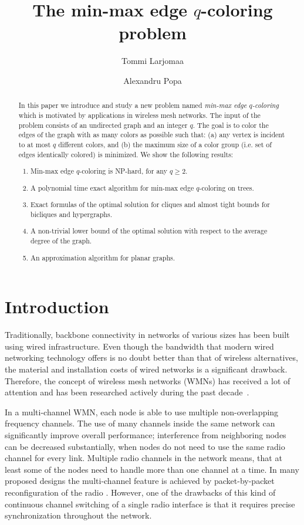 \documentclass[runningheads, a4paper]{llncs}
\title{The min-max edge $q$-coloring problem}
\author{Tommi Larjomaa \and Alexandru Popa}
\institute{
Department of Communications \& Networking, Aalto University School of Electrical Engineering, Aalto, Finland. \\ E-mails: \email{\{tommi.larjomaa@aalto.fi, alexandru.popa@aalto.fi\}}
}
\begin{document}
\maketitle
\begin{abstract}
In this paper we introduce and study a new problem named \emph{min-max edge $q$-coloring} which is motivated by applications in wireless mesh networks. The input of the problem consists of an undirected graph and an integer $q$. The goal is to color the edges of the graph with as many colors as possible such that: (a) any vertex is incident to at most $q$ different colors, and (b) the maximum size of a color group (i.e. set of edges identically colored) is minimized. We show the following results:
\begin{enumerate}
\item Min-max edge $q$-coloring is NP-hard, for any $q \ge 2$.
\item A polynomial time exact algorithm for min-max edge $q$-coloring on trees.
\item Exact formulas of the optimal solution for cliques and almost tight bounds for bicliques and hypergraphs. 
\item A non-trivial lower bound of the optimal solution with respect to the average degree of the graph.
\item An approximation algorithm for planar graphs.
\end{enumerate}
\end{abstract}

\section{Introduction}



Traditionally, backbone connectivity in networks of various sizes has been built using wired infrastructure. Even though the bandwidth that modern wired networking technology offers is no doubt better than that of wireless alternatives, the material and installation costs of wired networks is a significant drawback. Therefore, the concept of wireless mesh networks (WMNs) has received a lot of attention and has been researched actively during the past decade~\cite{Akyildiz2005445,Wang2008,draves2004,gupta2009,koksal2006}.


In a multi-channel WMN, each node is able to use multiple non-overlapping frequency channels. The use of many channels inside the same network can significantly improve overall performance; interference from neighboring nodes can be decreased substantially, when nodes do not need to use the same radio channel for every link. Multiple radio channels in the network means, that at least some of the nodes need to handle more than one channel at a time. In many proposed designs the multi-channel feature is achieved by packet-by-packet reconfiguration of the radio \cite{muir1998,kyasanur2005,so2004}. However, one of the drawbacks of this kind of continuous channel switching of a single radio interface is that it requires precise synchronization throughout the network.
\end{document}
